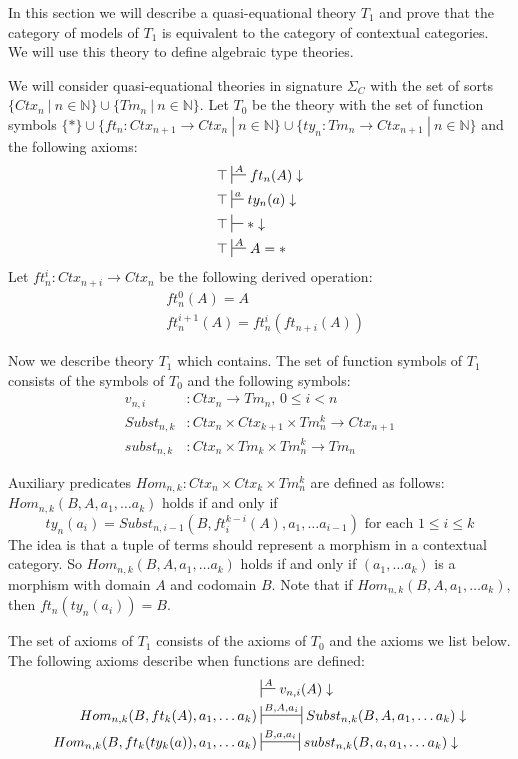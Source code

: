 \documentclass{amsart}
\theoremstyle{definition}
\theoremstyle{remark}
\numberwithin{figure}{section}
\begin{document}
In this section we will describe a quasi-equational theory $T_1$ and prove that the category of models of $T_1$ is equivalent to the category of contextual categories.
We will use this theory to define algebraic type theories.

We will consider quasi-equational theories in signature $\Sigma_C$ with the set of sorts $\{ Ctx_n\ |\ n \in \mathbb{N} \} \cup \{ Tm_n\ |\ n \in \mathbb{N} \}$.
Let $T_0$ be the theory with the set of function symbols $\{ * \} \cup \{ ft_n : Ctx_{n+1} \to Ctx_n\ |\ n \in \mathbb{N} \} \cup \{ ty_n : Tm_n \to Ctx_{n+1}\ |\ n \in \mathbb{N} \}$ and the following axioms:
\begin{align*}
& \top \sststile{}{A} ft_n(A) \downarrow \\
& \top \sststile{}{a} ty_n(a) \downarrow \\
& \top \sststile{}{} * \downarrow \\
& \top \sststile{}{A} A = *
\end{align*}
Let $ft^i_n : Ctx_{n+i} \to Ctx_n$ be the following derived operation:
\begin{align*}
& ft^0_n(A) = A \\
& ft^{i+1}_n(A) = ft^i_n(ft_{n+i}(A))
\end{align*}

Now we describe theory $T_1$ which contains.
The set of function symbols of $T_1$ consists of the symbols of $T_0$ and the following symbols:
\begin{align*}
v_{n,i}     & : Ctx_n \to Tm_n \text{, } 0 \leq i < n \\
Subst_{n,k} & : Ctx_n \times Ctx_{k+1} \times Tm_n^k \to Ctx_{n+1} \\
subst_{n,k} & : Ctx_n \times Tm_k \times Tm_n^k \to Tm_n
\end{align*}

Auxiliary predicates $Hom_{n,k} : Ctx_n \times Ctx_k \times Tm_n^k$ are defined as follows: $Hom_{n,k}(B, A, a_1, \ldots a_k)$ holds if and only if
\[ ty_n(a_i) = Subst_{n,i-1}(B, ft^{k-i}_i(A), a_1, \ldots a_{i-1}) \text{ for each } 1 \leq i \leq k \]
The idea is that a tuple of terms should represent a morphism in a contextual category.
So $Hom_{n,k}(B, A, a_1, \ldots a_k)$ holds if and only if $(a_1, \ldots a_k)$ is a morphism with domain $A$ and codomain $B$.
Note that if $Hom_{n,k}(B, A, a_1, \ldots a_k)$, then $ft_n(ty_n(a_i)) = B$.

The set of axioms of $T_1$ consists of the axioms of $T_0$ and the axioms we list below.
The following axioms describe when functions are defined:
\begin{align}
\label{ax:def-var}
                                             & \sststile{}{A}           v_{n,i}(A) \downarrow \\
\label{ax:def-Subst}
Hom_{n,k}(B, ft_k(A), a_1, \ldots a_k)       & \ssststile{}{B, A, a_i}  Subst_{n,k}(B, A, a_1, \ldots a_k) \downarrow \\
\label{ax:def-subst}
Hom_{n,k}(B, ft_k(ty_k(a)), a_1, \ldots a_k) & \ssststile{}{B, a, a_i}  subst_{n,k}(B, a, a_1, \ldots a_k) \downarrow
\end{align}
\end{document}
